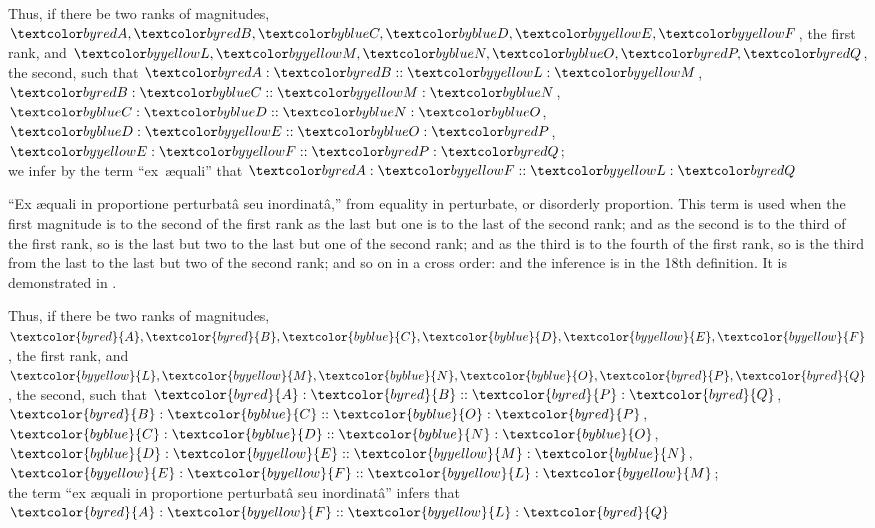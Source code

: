 \documentclass[booklanguage=english]{byrnebook}
\begin{document}
\begin{center}
Thus, if there be two ranks of magnitudes,\\
$\varA, \varB, \varC, \varD, \varE, \varF$, the first rank,
and $\varL, \varM, \varN, \varO, \varP, \varQ$, the second,
such that $\varA : \varB :: \varL : \varM$, $\varB : \varC :: \varM : \varN$, $\varC : \varD :: \varN : \varO$, $\varD : \varE :: \varO : \varP$, $\varE : \varF :: \varP : \varQ$;\\
we infer by the term \enquote{ex~\ae quali} that $\varA : \varF :: \varL : \varQ$
\end{center}

\label{def:V.XX} 
\def\varA{\textcolor{byred}{A}}
\def\varB{\textcolor{byred}{B}}
\def\varC{\textcolor{byblue}{C}}
\def\varD{\textcolor{byblue}{D}}
\def\varE{\textcolor{byyellow}{E}}
\def\varF{\textcolor{byyellow}{F}}
\def\varL{\textcolor{byyellow}{L}}
\def\varM{\textcolor{byyellow}{M}}
\def\varN{\textcolor{byblue}{N}}
\def\varO{\textcolor{byblue}{O}}
\def\varP{\textcolor{byred}{P}}
\def\varQ{\textcolor{byred}{Q}}
\enquote{Ex \ae quali in proportione perturbatâ seu inordinatâ,} from equality in perturbate, or disorderly proportion. This term is used when the first magnitude is to the second of the first rank as the last but one is to the last of the second rank; and as the second is to the third of the first rank, so is the last but two to the last but one of the second rank; and as the third is to the fourth of the first rank, so is the third from the last to the last but two of the second rank; and so on in a cross order: and the inference is in the 18th definition. It is demonstrated in .

\begin{center}
Thus, if there be two ranks of magnitudes,\\
$\varA, \varB, \varC, \varD, \varE, \varF$, the first rank,
and $\varL, \varM, \varN, \varO, \varP, \varQ$, the second,
such that $\varA : \varB :: \varP : \varQ$, $\varB : \varC :: \varO : \varP$, $\varC : \varD :: \varN : \varO$, $\varD : \varE :: \varM : \varN$, $\varE : \varF :: \varL : \varM$;\\
the term \enquote{ex \ae quali in proportione perturbatâ seu inordinatâ} infers that $\varA : \varF :: \varL : \varQ$
\end{center}

\vfill\pagebreak

\label{prop:V.XX}
\end{document}
